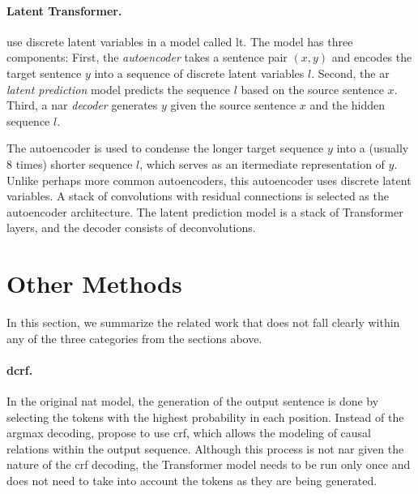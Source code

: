 \paragraph{Latent Transformer.} \citet{kaiser2018fast} use discrete latent
variables in a model called \acf{lt}. The model has three
components: First, the \emph{autoencoder} takes a sentence pair $(x, y)$ and
encodes the target sentence $y$ into a sequence of discrete latent variables
$l$. Second, the \acl{ar} \emph{latent prediction} model predicts the sequence
$l$ based on the source sentence $x$. Third, a \acl{nar} \emph{decoder}
generates $y$ given the source sentence $x$ and the hidden sequence $l$.

The autoencoder is used to condense the longer target sequence $y$ into a
(usually 8 times) shorter sequence $l$, which serves as an itermediate
representation of $y$. Unlike perhaps more common autoencoders, this
autoencoder uses discrete latent variables.
A stack of convolutions with residual connections is selected as the
autoencoder architecture. The latent prediction model is a stack of Transformer
layers, and the decoder consists of deconvolutions. 


\section{Other Methods}%
\label{sec:nat:misc}

In this section, we summarize the related work that does not fall clearly
within any of the three categories from the sections above.


\paragraph{\Acl{dcrf}.} %
In the original \ac{nat} model, the generation of the output sentence is done
by selecting the tokens with the highest probability in each position. Instead
of the argmax decoding, \citet{sun2019fast} propose to use \ac{crf}, which
allows the modeling of causal relations within the output sequence. Although
this process is not \acl{nar} given the nature of the \ac{crf} decoding, the
Transformer model needs to be run only once and does not need to take into
account the tokens as they are being generated.

